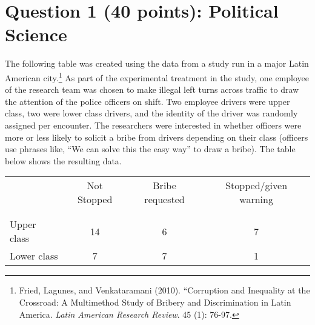 \documentclass[12pt,letterpaper]{article}
\begin{document}
	\section*{Question 1 (40 points): Political Science}
		\vspace{.25cm}
	The following table was created using the data from a study run in a major Latin American city.\footnote{Fried, Lagunes, and Venkataramani (2010). ``Corruption and Inequality at the Crossroad: A Multimethod Study of Bribery and Discrimination in Latin America. \textit{Latin American Research Review}. 45 (1): 76-97.} As part of the experimental treatment in the study, one employee of the research team was chosen to make illegal left turns across traffic to draw the attention of the police officers on shift. Two employee drivers were upper class, two were lower class drivers, and the identity of the driver was randomly assigned per encounter. The researchers were interested in whether officers were more or less likely to solicit a bribe from drivers depending on their class (officers use phrases like, ``We can solve this the easy way'' to draw a bribe). The table below shows the resulting data.
\newpage
\begin{table}[h!]
	\centering
	\begin{tabular}{l | c c c }
		& Not Stopped & Bribe requested & Stopped/given warning \\
		\\[-1.8ex] 
		\hline \\[-1.8ex]
		Upper class & 14 & 6 & 7 \\
		Lower class & 7 & 7 & 1 \\
		\hline
	\end{tabular}
\end{table}
\end{document}
